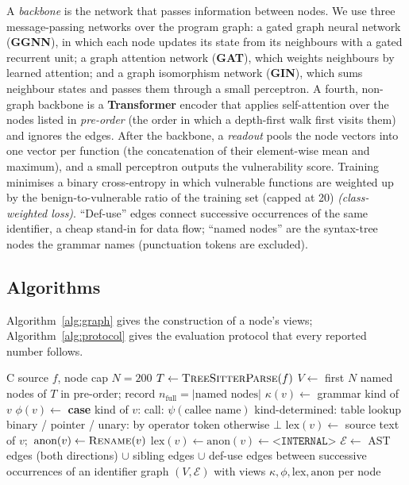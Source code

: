 \documentclass[pdflatex,sn-basic]{sn-jnl}
\theoremstyle{thmstyleone}%
\begin{document}
A \emph{backbone} is the network that passes information between nodes. We use
three message-passing networks over the program graph: a gated graph neural
network (\textbf{GGNN}), in which each node updates its state from its
neighbours with a gated recurrent unit; a graph attention network
(\textbf{GAT}), which weights neighbours by learned attention; and a graph
isomorphism network (\textbf{GIN}), which sums neighbour states and passes them
through a small perceptron. A fourth, non-graph backbone is a \textbf{Transformer}
encoder that applies self-attention over the nodes listed in \emph{pre-order}
(the order in which a depth-first walk first visits them) and ignores the
edges. After the backbone, a \emph{readout} pools the node vectors into one
vector per function (the concatenation of their element-wise mean and
maximum), and a small perceptron outputs the vulnerability score. Training
minimises a binary cross-entropy in which vulnerable functions are weighted up
by the benign-to-vulnerable ratio of the training set (capped at 20)
\emph{(class-weighted loss)}. ``Def-use'' edges connect successive occurrences
of the same identifier, a cheap stand-in for data flow; ``named nodes'' are the
syntax-tree nodes the grammar names (punctuation tokens are excluded).

\subsection{Algorithms}
\label{sec:algorithms}

Algorithm~\ref{alg:graph} gives the construction of a node's views;
Algorithm~\ref{alg:protocol} gives the evaluation protocol that every reported
number follows.

\begin{algorithm}[t]
\caption{Program graph and node views for one function}
\label{alg:graph}
\begin{algorithmic}[1]
\Require C source $f$, node cap $N=200$
\State $T \leftarrow \textsc{TreeSitterParse}(f)$
\State $V \leftarrow$ first $N$ named nodes of $T$ in pre-order; record $n_{\text{full}}=|\text{named nodes}|$
  \State $\kappa(v) \leftarrow$ grammar kind of $v$
  \State $\phi(v) \leftarrow$ \textbf{case} kind of $v$:
  \State \quad call: $\psi(\text{callee name})$ 
  \State \quad kind-determined: table lookup 
  \State \quad binary / pointer / unary: by operator token
  \State \quad otherwise $\bot$
     \State $\text{lex}(v) \leftarrow$ source text of $v$;\ $\text{anon}(v) \leftarrow \textsc{Rename}(v)$ 
  \Else
     \State $\text{lex}(v) \leftarrow \text{anon}(v) \leftarrow \texttt{<INTERNAL>}$
  \EndIf
\EndFor
\State $\mathcal{E} \leftarrow$ AST edges (both directions) $\cup$ sibling edges $\cup$ def-use edges between successive occurrences of an identifier
\State \Return graph $(V,\mathcal{E})$ with views $\kappa,\phi,\text{lex},\text{anon}$ per node
\end{algorithmic}
\end{algorithm}
\end{document}
